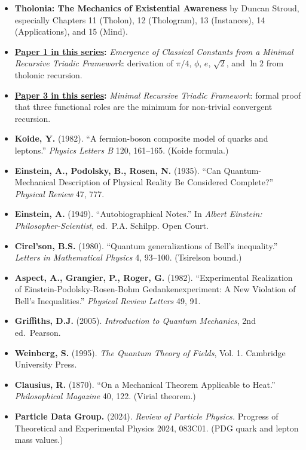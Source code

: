 \documentclass[
  11pt,
  letterpaper,
]{article}
\providecommand{\tightlist}{%
  \setlength{\itemsep}{0pt}\setlength{\parskip}{0pt}}
\begin{document}
\begin{itemize}
\tightlist
\item
  \textbf{Tholonia: The Mechanics of Existential Awareness} by Duncan
  Stroud, especially Chapters 11 (Tholon), 12 (Thologram), 13
  (Instances), 14 (Applications), and 15 (Mind).
\item
  \textbf{\href{https://github.com/baardev/truevalue/blob/main/docnav/Research/papers/1_recursive-tholonic-five-constants/1_recursive-tholonic-five-constants.pdf}{Paper
  1 in this series}:} \emph{Emergence of Classical Constants from a
  Minimal Recursive Triadic Framework}: derivation of \(\pi/4\),
  \(\phi\), \(e\), \(\sqrt{2}\), and \(\ln 2\) from tholonic recursion.
\item
  \textbf{\href{https://github.com/baardev/truevalue/blob/main/docnav/Research/papers/3_minimal-recursive-triadic-framework/3_minimal-recursive-triadic-framework.pdf}{Paper
  3 in this series}:} \emph{Minimal Recursive Triadic Framework}: formal
  proof that three functional roles are the minimum for non-trivial
  convergent recursion.
\item
  \textbf{Koide, Y.} (1982). ``A fermion-boson composite model of quarks
  and leptons.'' \emph{Physics Letters B} 120, 161--165. (Koide
  formula.)
\item
  \textbf{Einstein, A., Podolsky, B., Rosen, N.} (1935). ``Can
  Quantum-Mechanical Description of Physical Reality Be Considered
  Complete?'' \emph{Physical Review} 47, 777.
\item
  \textbf{Einstein, A.} (1949). ``Autobiographical Notes.'' In
  \emph{Albert Einstein: Philosopher-Scientist}, ed.~P.A. Schilpp. Open
  Court.
\item
  \textbf{Cirel'son, B.S.} (1980). ``Quantum generalizations of Bell's
  inequality.'' \emph{Letters in Mathematical Physics} 4, 93--100.
  (Tsirelson bound.)
\item
  \textbf{Aspect, A., Grangier, P., Roger, G.} (1982). ``Experimental
  Realization of Einstein-Podolsky-Rosen-Bohm Gedankenexperiment: A New
  Violation of Bell's Inequalities.'' \emph{Physical Review Letters} 49,
  91.
\item
  \textbf{Griffiths, D.J.} (2005). \emph{Introduction to Quantum
  Mechanics}, 2nd ed.~Pearson.
\item
  \textbf{Weinberg, S.} (1995). \emph{The Quantum Theory of Fields},
  Vol. 1. Cambridge University Press.
\item
  \textbf{Clausius, R.} (1870). ``On a Mechanical Theorem Applicable to
  Heat.'' \emph{Philosophical Magazine} 40, 122. (Virial theorem.)
\item
  \textbf{Particle Data Group.} (2024). \emph{Review of Particle
  Physics.} Progress of Theoretical and Experimental Physics 2024,
  083C01. (PDG quark and lepton mass values.)
\end{itemize}
\end{document}
